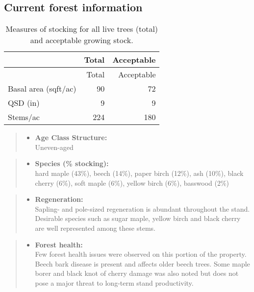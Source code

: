 \documentclass[]{tufte-handout}
\providecommand{\tightlist}{%
  \setlength{\itemsep}{0pt}\setlength{\parskip}{0pt}}
\begin{document}
\subsection{Current forest
information}\label{current-forest-information}

\begin{longtable}[]{@{}lrr@{}}
\caption{Measures of stocking for all live trees (total) and acceptable
growing stock.}\tabularnewline
\toprule
& Total & Acceptable\tabularnewline
\midrule
\endfirsthead
\toprule
& Total & Acceptable\tabularnewline
\midrule
\endhead
Basal area (sqft/ac) & 90 & 72\tabularnewline
QSD (in) & 9 & 9\tabularnewline
Stems/ac & 224 & 180\tabularnewline
\bottomrule
\end{longtable}

\begin{quote}
\begin{itemize}
\tightlist
\item
  \textbf{Age Class Structure:}\\
  \vspace{2pt} Uneven-aged
\end{itemize}
\end{quote}

\begin{quote}
\begin{itemize}
\tightlist
\item
  \textbf{Species (\% stocking):}\\
  \vspace{2pt} hard maple (43\%), beech (14\%), paper birch (12\%), ash
  (10\%), black cherry (6\%), soft maple (6\%), yellow birch (6\%),
  basswood (2\%)
\end{itemize}
\end{quote}

\begin{quote}
\begin{itemize}
\tightlist
\item
  \textbf{Regeneration:}\\
  \vspace{2pt} Sapling- and pole-sized regeneration is abundant
  throughout the stand. Desirable species such as sugar maple, yellow
  birch and black cherry are well represented among these stems.
\end{itemize}
\end{quote}

\begin{quote}
\begin{itemize}
\tightlist
\item
  \textbf{Forest health:}\\
  \vspace{2pt} Few forest health issues were observed on this portion of
  the property. Beech bark disease is present and affects older beech
  trees. Some maple borer and black knot of cherry damage was also noted
  but does not pose a major threat to long-term stand productivity.
\end{itemize}
\end{quote}
\end{document}
